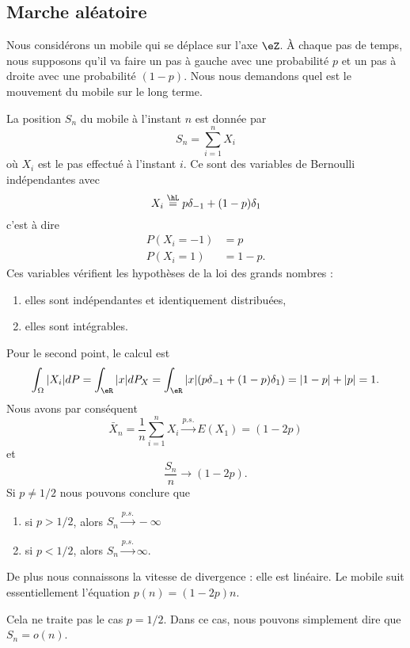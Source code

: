 \subsection{Marche aléatoire}

Nous considérons un mobile qui se déplace sur l'axe \( \eZ\). À chaque pas de temps, nous supposons qu'il va faire un pas à gauche avec une probabilité \( p\) et un pas à droite avec une probabilité \( (1-p)\). Nous nous demandons quel est le mouvement du mobile sur le long terme.

La position \( S_n\) du mobile à l'instant \( n\) est donnée par
\begin{equation}
    S_n=\sum_{i=1}^nX_i
\end{equation}
où \( X_i\) est le pas effectué à l'instant \( i\). Ce sont des variables de Bernoulli indépendantes avec
\begin{equation}
    X_i\stackrel{\hL}{=}p\delta_{-1}+(1-p)\delta_1
\end{equation}
c'est à dire
\begin{subequations}
    \begin{align}
        P(X_i=-1)&=p\\
        P(X_i=1)&=1-p.
    \end{align}
\end{subequations}
Ces variables vérifient les hypothèses de la loi des grands nombres :
\begin{enumerate}
    \item
        elles sont indépendantes et identiquement distribuées,
    \item
        elles sont intégrables.
\end{enumerate}
Pour le second point, le calcul est
\begin{equation}
    \int_{\Omega}| X_i |dP=\int_{\eR}| x |dP_X=\int_{\eR}| x |(p\delta_{-1}+(1-p)\delta_{1})=| 1-p |+| p |=1.
\end{equation}
Nous avons par conséquent
\begin{equation}
    \bar X_n=\frac{1}{ n }\sum_{i=1}^nX_i\stackrel{p.s.}{\longrightarrow} E(X_1)=(1-2p)
\end{equation}
et
\begin{equation}
    \frac{ S_n }{ n }\to(1-2p).
\end{equation}
Si \( p\neq 1/2\) nous pouvons conclure que
\begin{enumerate}
    \item
        si \( p>1/2\), alors \( S_n\stackrel{p.s.}{\longrightarrow}-\infty\)
    \item
        si \( p<1/2\), alors \( S_n\stackrel{p.s.}{\longrightarrow}\infty\).
\end{enumerate}
De plus nous connaissons la vitesse de divergence : elle est linéaire. Le mobile suit essentiellement l'équation
\( p(n)=(1-2p)n\).

\begin{remark}
    Cela ne traite pas le cas \( p=1/2\). Dans ce cas, nous pouvons simplement dire que \( S_n=o(n)\).
\end{remark}
